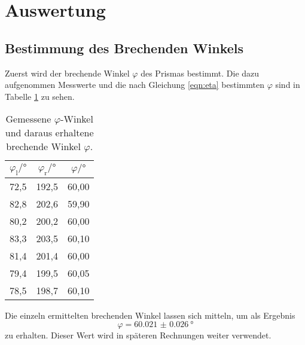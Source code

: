 \section{Auswertung}
\label{sec:Auswertung}
\subsection{Bestimmung des Brechenden Winkels}
\label{subsec:brechwinkel}
Zuerst wird der brechende Winkel $\varphi$ des Prismas bestimmt.
Die dazu aufgenommen Messwerte und die nach Gleichung \eqref{eqn:eta}
bestimmten $\varphi$ sind in Tabelle \ref{tab:phi} zu sehen.

\begin{table}[htp]
	\begin{center}
    \caption{Gemessene $\varphi$-Winkel und daraus erhaltene brechende Winkel $\varphi$.}
    \label{tab:phi}
		\begin{tabular}{ccc}
		\toprule
			{$\varphi_\text{l}/°$} & {$\varphi_\text{r}/°$} & {$\varphi/°$} \\
			\midrule
      72,5 & 192,5 & 60,00 \\
      82,8 & 202,6 & 59,90 \\
      80,2 & 200,2 & 60,00 \\
      83,3 & 203,5 & 60,10 \\
      81,4 & 201,4 & 60,00 \\
      79,4 & 199,5 & 60,05 \\
      78,5 & 198,7 & 60,10 \\
		\bottomrule
		\end{tabular}
	\end{center}
\end{table}

Die einzeln ermittelten brechenden Winkel lassen sich mitteln, um als Ergebnis
\begin{equation*}
  \varphi = \SI{60.021(26)}{\degree}
\end{equation*}
zu erhalten. Dieser Wert wird in späteren Rechnungen weiter verwendet.

